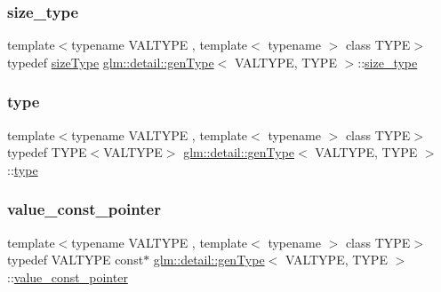 \mbox{\label{structglm_1_1detail_1_1gen_type_af4fa06eb65eebb96960fae19a3b439eb}} 
\subsubsection{\texorpdfstring{size\+\_\+type}{size\_type}}
{\footnotesize\ttfamily template$<$typename V\+A\+L\+T\+Y\+PE , template$<$ typename $>$ class T\+Y\+PE$>$ \\
typedef \mbox{\hyperlink{namespaceglm_ae49d80f7bfe4be96585fe8f1d3431cc6}{size\+Type}} \mbox{\hyperlink{structglm_1_1detail_1_1gen_type}{glm\+::detail\+::gen\+Type}}$<$ V\+A\+L\+T\+Y\+PE, T\+Y\+PE $>$\+::\mbox{\hyperlink{structglm_1_1detail_1_1gen_type_af4fa06eb65eebb96960fae19a3b439eb}{size\+\_\+type}}}

\mbox{\label{structglm_1_1detail_1_1gen_type_a17dbd44c7a86d09e6ea05b72cb02bccf}} 
\subsubsection{\texorpdfstring{type}{type}}
{\footnotesize\ttfamily template$<$typename V\+A\+L\+T\+Y\+PE , template$<$ typename $>$ class T\+Y\+PE$>$ \\
typedef T\+Y\+PE$<$V\+A\+L\+T\+Y\+PE$>$ \mbox{\hyperlink{structglm_1_1detail_1_1gen_type}{glm\+::detail\+::gen\+Type}}$<$ V\+A\+L\+T\+Y\+PE, T\+Y\+PE $>$\+::\mbox{\hyperlink{structglm_1_1detail_1_1gen_type_a17dbd44c7a86d09e6ea05b72cb02bccf}{type}}}

\mbox{\label{structglm_1_1detail_1_1gen_type_a34e169ae6d50e1c76574c850eae2c7fc}} 
\subsubsection{\texorpdfstring{value\+\_\+const\+\_\+pointer}{value\_const\_pointer}}
{\footnotesize\ttfamily template$<$typename V\+A\+L\+T\+Y\+PE , template$<$ typename $>$ class T\+Y\+PE$>$ \\
typedef V\+A\+L\+T\+Y\+PE const$\ast$ \mbox{\hyperlink{structglm_1_1detail_1_1gen_type}{glm\+::detail\+::gen\+Type}}$<$ V\+A\+L\+T\+Y\+PE, T\+Y\+PE $>$\+::\mbox{\hyperlink{structglm_1_1detail_1_1gen_type_a34e169ae6d50e1c76574c850eae2c7fc}{value\+\_\+const\+\_\+pointer}}}

